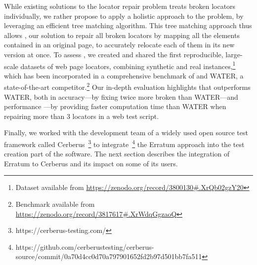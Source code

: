 While existing solutions to the locator repair problem treats broken locators individually, we rather propose to apply a holistic approach to the problem, by leveraging an efficient tree matching algorithm.
This tree matching approach thus allows \erratum{}, our solution to repair all broken locators by mapping all the elements contained in an original page, to accurately relocate each of them in its new version at once.
% 
To assess \erratum{}, we created and shared the first reproducible, large-scale datasets of web page locators, combining synthetic and real instances,\footnote{Dataset available from \url{https://zenodo.org/record/3800130\#.XrQb02gzY20}} which has been incorporated in a comprehensive benchmark of \erratum{} and WATER, a state-of-the-art competitor.\footnote{Benchmark available from \url{https://zenodo.org/record/3817617\#.XrWdqGgzaoQ}}
%
Our in-depth evaluation highlights that \erratum{} outperforms WATER, both in accuracy---by fixing twice more broken than WATER---and performance ---by providing faster computation time than WATER when repairing more than 3 locators in a web test script.

Finally, we worked with the development team of a widely used open source test framework called Cerberus~\footnote{https://cerberus-testing.com/} to integrate~\footnote{https://github.com/cerberustesting/cerberus-source/commit/0a70d4cc0d70a797901652fd2b97d501bb7fa511} the Erratum approach into the test creation part of the software.
The next section describes the integration of Erratum to Cerberus and its impact on some of its users.

